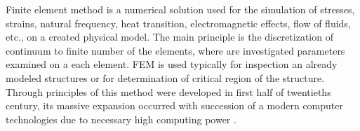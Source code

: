 Finite element method is a numerical solution used for the simulation of stresses, strains, natural frequency, heat transition, electromagnetic effects, flow of fluids, etc., on a created physical model. The main principle is the discretization of continuum to finite number of the elements, where are investigated parameters examined on a each element. FEM is used typically for inspection an already modeled structures or for determination of critical region of the structure. Through principles of this method were developed in first half of twentieths century, its massive expansion occurred with succession of a modern computer technologies due to necessary high computing power \cite{dhatt2012finite}. 

